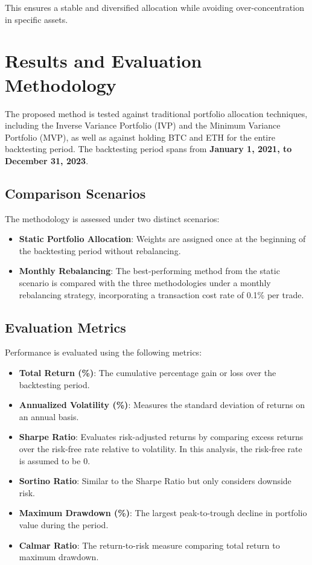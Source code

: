 \documentclass[english]{maciarticle}
\begin{document}
This ensures a stable and diversified allocation while avoiding over-concentration in specific assets.

\section{Results and Evaluation Methodology}

The proposed method is tested against traditional portfolio allocation techniques, including the Inverse Variance Portfolio (IVP) and the Minimum Variance Portfolio (MVP), as well as against holding BTC and ETH for the entire backtesting period. The backtesting period spans from  \textbf{January 1, 2021, to December 31, 2023}.

\subsection{Comparison Scenarios}
The methodology is assessed under two distinct scenarios:

\begin{itemize}
    \item \textbf{Static Portfolio Allocation}: Weights are assigned once at the beginning of the backtesting period without rebalancing.
    \item \textbf{Monthly Rebalancing}: The best-performing method from the static scenario is compared with the three methodologies under a monthly rebalancing strategy, incorporating a transaction cost rate of 0.1\% per trade.
\end{itemize}

\subsection{Evaluation Metrics}
Performance is evaluated using the following metrics:

\begin{itemize}
    \item \textbf{Total Return (\%)}: The cumulative percentage gain or loss over the backtesting period.
    \item \textbf{Annualized Volatility (\%)}: Measures the standard deviation of returns on an annual basis.
    \item \textbf{Sharpe Ratio}: Evaluates risk-adjusted returns by comparing excess returns over the risk-free rate relative to volatility. In this analysis, the risk-free rate is assumed to be 0.
    \item \textbf{Sortino Ratio}: Similar to the Sharpe Ratio but only considers downside risk.
    \item \textbf{Maximum Drawdown (\%)}: The largest peak-to-trough decline in portfolio value during the period.
    \item \textbf{Calmar Ratio}: The return-to-risk measure comparing total return to maximum drawdown.
\end{itemize}
\end{document}
